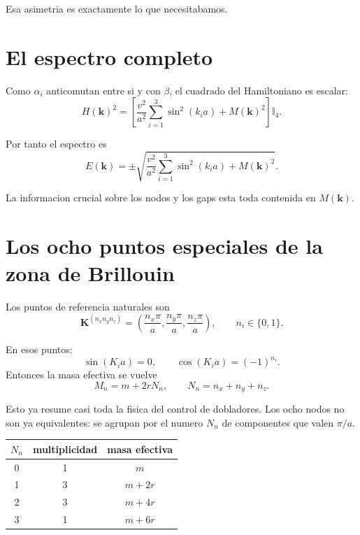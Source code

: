 Esa asimetria es exactamente lo que necesitabamos.

\section{El espectro completo}
Como \(\alpha_i\) anticomutan entre si y con \(\beta\), el cuadrado del Hamiltoniano es escalar:
\begin{equation}
H(\bm{k})^2=
\left[
\frac{v^2}{a^2}\sum_{i=1}^3 \sin^2(k_i a)+M(\bm{k})^2
\right]\mathbb{I}_4.
\end{equation}

Por tanto el espectro es
\begin{equation}
E(\bm{k})=
\pm
\sqrt{
\frac{v^2}{a^2}\sum_{i=1}^3 \sin^2(k_i a)+M(\bm{k})^2
}.
\label{c14:eq:spec}
\end{equation}

La informacion crucial sobre los nodos y los gaps esta toda contenida en \(M(\bm{k})\).

\section{Los ocho puntos especiales de la zona de Brillouin}
Los puntos de referencia naturales son
\begin{equation}
\bm{K}^{(n_x n_y n_z)}=
\left(
\frac{n_x\pi}{a},
\frac{n_y\pi}{a},
\frac{n_z\pi}{a}
\right),
\qquad
n_i\in\{0,1\}.
\label{c14:eq:TRIM}
\end{equation}

En esos puntos:
\begin{equation}
\sin(K_i a)=0,
\qquad
\cos(K_i a)=(-1)^{n_i}.
\end{equation}
Entonces la masa efectiva se vuelve
\begin{equation}
M_n = m + 2rN_n,
\qquad
N_n=n_x+n_y+n_z.
\label{c14:eq:Mn}
\end{equation}

Esto ya resume casi toda la fisica del control de dobladores. Los ocho nodos no son ya equivalentes: se agrupan por el numero \(N_n\) de componentes que valen \(\pi/a\).

\begin{center}
\begin{tabular}{c c c}
\toprule
\(N_n\) & multiplicidad & masa efectiva \\
\midrule
0 & 1 & \(m\) \\
1 & 3 & \(m+2r\) \\
2 & 3 & \(m+4r\) \\
3 & 1 & \(m+6r\) \\
\bottomrule
\end{tabular}
\end{center}

